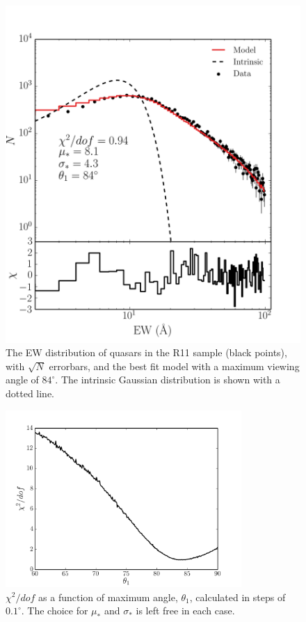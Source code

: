 \begin{figure}
\centering
\includegraphics[width=1.0\textwidth]{figures/ewpaper/log_quasar_fit.png}
\caption
{
The EW distribution of quasars in the R11 sample (black points), 
with $\sqrt{N}$ errorbars, and the best fit model with a maximum 
viewing angle of $84^\circ$. The intrinsic Gaussian distribution
is shown with a dotted line. 
}
\label{fig:chi2}
\end{figure}

\begin{figure}
\centering
\includegraphics[width=0.8\textwidth]{figures/ewpaper/chi2_o3.png}
\caption
{
$\chi^2/dof$ as a function of maximum angle, $\theta_1$, calculated in
steps of $0.1^\circ$. The choice for $\mu_*$ and $\sigma_*$ is 
left free in each case.
}
\label{fig:chi2_curve}
\end{figure}

